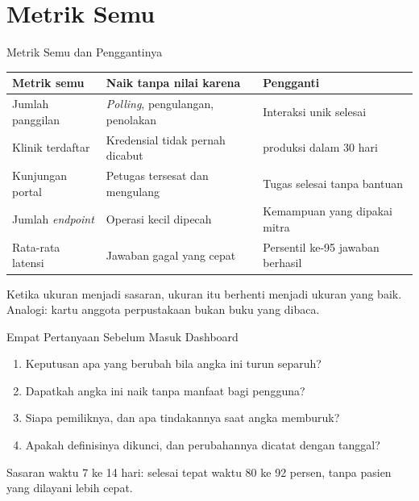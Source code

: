 \documentclass[aspectratio=169, table, 12pt]{beamer}
\begin{document}
\section{Metrik Semu}

\begin{frame}{{\Large Metrik Semu dan Penggantinya}}
  \footnotesize
  \begin{tabularx}{\textwidth}{>{\raggedright\arraybackslash}p{2.9cm} >{\raggedright\arraybackslash}X >{\raggedright\arraybackslash}X}
    \hline
    \textbf{Metrik semu} & \textbf{Naik tanpa nilai karena} & \textbf{Pengganti} \\ \hline
    Jumlah panggilan & \textit{Polling}, pengulangan, penolakan & Interaksi unik selesai \\ \hline
    Klinik terdaftar & Kredensial tidak pernah dicabut & 201 produksi dalam 30 hari \\ \hline
    Kunjungan portal & Petugas tersesat dan mengulang & Tugas selesai tanpa bantuan \\ \hline
    Jumlah \textit{endpoint} & Operasi kecil dipecah & Kemampuan yang dipakai mitra \\ \hline
    Rata-rata latensi & Jawaban gagal yang cepat & Persentil ke-95 jawaban berhasil \\ \hline
  \end{tabularx}

  \vspace{8pt}
  \small Ketika ukuran menjadi sasaran, ukuran itu berhenti menjadi ukuran yang baik. Analogi: kartu anggota perpustakaan bukan buku yang dibaca.
\end{frame}

\begin{frame}{{\Large Empat Pertanyaan Sebelum Masuk Dashboard}}
  \vspace{8pt}
  \begin{enumerate}
    \item Keputusan apa yang berubah bila angka ini turun separuh?
    \item Dapatkah angka ini naik tanpa manfaat bagi pengguna?
    \item Siapa pemiliknya, dan apa tindakannya saat angka memburuk?
    \item Apakah definisinya dikunci, dan perubahannya dicatat dengan tanggal?
  \end{enumerate}
  \vspace{6pt}
  {\small Sasaran waktu 7 ke 14 hari: selesai tepat waktu 80 ke 92 persen, tanpa pasien yang dilayani lebih cepat.}
\end{frame}
\end{document}

